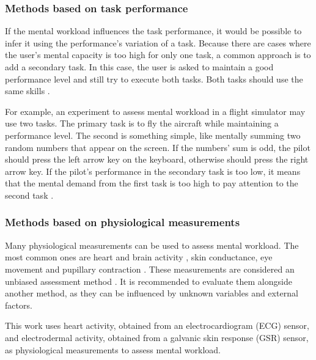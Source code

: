     \subsubsection*{Methods based on task performance}
    
        If the mental workload influences the task performance, it would be possible to infer it using the performance's variation of a task. Because there are cases where the user's mental capacity is too high for only one task, a common approach is to add a secondary task. In this case, the user is asked to maintain a good performance level and still try to execute both tasks. Both tasks should use the same skills \cite{stanton2004handbook, sanders1998human}.
        
        For example, an experiment to assess mental workload in a flight simulator may use two tasks. The primary task is to fly the aircraft while maintaining a performance level. The second is something simple, like mentally summing two random numbers that appear on the screen. If the numbers' sum is odd, the pilot should press the left arrow key on the keyboard, otherwise should press the right arrow key. If the pilot's performance in the secondary task is too low, it means that the mental demand from the first task is too high to pay attention to the second task \cite{mohanavelu2020cognitive}.
        
    \subsubsection*{Methods based on physiological measurements}
    
        Many physiological measurements can be used to assess mental workload. The most common ones are heart and brain activity \cite{chakladar2020eeg, orlandi2018measuring}, skin conductance, eye movement and pupillary contraction \cite{stanton2004handbook, rodriguez2015pupillometry}. These measurements are considered an unbiased assessment method \cite{fallahi2016effects}. It is recommended to evaluate them alongside another method, as they can be influenced by unknown variables and external factors.

        This work uses heart activity, obtained from an electrocardiogram (ECG) sensor, and electrodermal activity, obtained from a galvanic skin response (GSR) sensor, as physiological measurements to assess mental workload.
                
